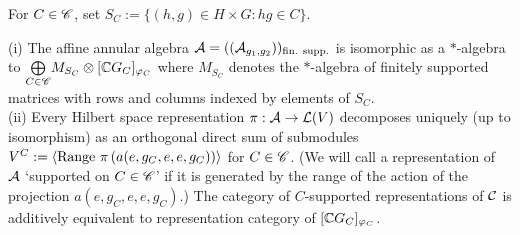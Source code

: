 For $ C \in \mathscr C $, set $ S_C:= \{ (h,g) \in H\times G : hg \in C\} $.
\begin{thm}\label{bhtubalg}
(i) The affine annular algebra $ \mathcal A = (( \mathcal A_{g_1 , g_2} ))_{\text{fin. supp.}}$%
is isomorphic as a $ * $-algebra to $\underset{C \in \mathscr C}{\bigoplus} M_{S_C} \otimes [\mathbb{C} G_C]_{\varphi_C}$ where $ M_{S_C} $ denotes the $ * $-algebra of finitely supported matrices with rows and columns indexed by elements of $ S_C $.\\
(ii) Every Hilbert space representation $ \pi : \mathcal A \rightarrow \mathcal L (V) $ decomposes uniquely (up to isomorphism) as an orthogonal direct sum of submodules $ V^C := \left\langle \text{Range } \pi \left(a(e,g_C, e , e, g_C)\right) \right\rangle$ for $ C \in \mathscr C $.
(We will call a representation of $ \mathcal A $ `supported on $ C \in \mathscr C$' if it is generated by the range of the action of the projection $ a(e,g_C, e , e, g_C) $.)
The category of $ C $-supported representations of $ \mathcal C $ is additively equivalent to representation category of $ [\mathbb{C} G_C]_{\varphi_C} $.


\end{thm}
